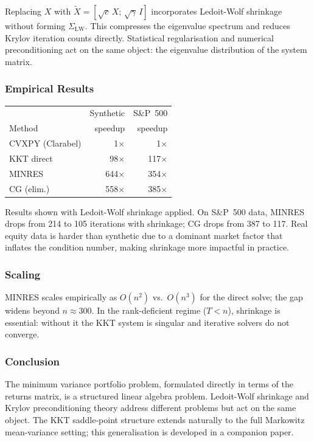 \documentclass[10pt,twocolumn]{article}
\begin{document}
Replacing $X$ with $\tilde{X} = [\sqrt{c}\,X;\,\sqrt{\gamma}\,I]$ incorporates Ledoit-Wolf
shrinkage \cite{ledoit2004} without forming $\Sigma_{\mathrm{LW}}$. This compresses the eigenvalue
spectrum and reduces Krylov iteration counts directly. Statistical regularisation and numerical
preconditioning act on the same object: the eigenvalue distribution of the system matrix.

\subsubsection*{Empirical Results}

\begin{center}
\small
\begin{tabular}{lrr}
\toprule
 & Synthetic & S\&P~500 \\
Method & speedup & speedup \\
\midrule
CVXPY (Clarabel) &   1$\times$ &   1$\times$ \\
KKT direct       &  98$\times$ & 117$\times$ \\
MINRES           & 644$\times$ & 354$\times$ \\
CG (elim.)       & 558$\times$ & 385$\times$ \\
\bottomrule
\end{tabular}
\end{center}

\noindent Results shown with Ledoit-Wolf shrinkage applied. On S\&P~500 data, MINRES drops from
214 to 105 iterations with shrinkage; CG drops from 387 to 117. Real equity data is harder than
synthetic due to a dominant market factor that inflates the condition number, making shrinkage
more impactful in practice.

\subsubsection*{Scaling}

MINRES scales empirically as $O(n^2)$ vs.\ $O(n^3)$ for the direct solve; the gap widens beyond
$n \approx 300$. In the rank-deficient regime ($T < n$), shrinkage is essential: without it the
KKT system is singular and iterative solvers do not converge.

\subsubsection*{Conclusion}

The minimum variance portfolio problem, formulated directly in terms of the returns matrix, is a
structured linear algebra problem. Ledoit-Wolf shrinkage and Krylov preconditioning theory address
different problems but act on the same object. The KKT saddle-point structure extends naturally to
the full Markowitz mean-variance setting; this generalisation is developed in a companion paper.

\renewcommand{\refname}{\small References}
\begingroup
\small


\endgroup
\end{document}
